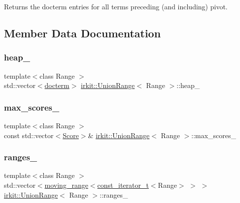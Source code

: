 Returns the docterm entries for all terms preceding (and including) pivot. 

\subsection{Member Data Documentation}
\mbox{\label{classirkit_1_1UnionRange_a613eebb9b7b8601bffdad1d842c8c7f0}} 
\subsubsection{\texorpdfstring{heap\+\_\+}{heap\_}}
{\footnotesize\ttfamily template$<$class Range $>$ \\
std\+::vector$<$\mbox{\hyperlink{structirkit_1_1UnionRange_1_1docterm}{docterm}}$>$ \mbox{\hyperlink{classirkit_1_1UnionRange}{irkit\+::\+Union\+Range}}$<$ Range $>$\+::heap\+\_\+\hspace{0.3cm}{\ttfamily [protected]}}

\mbox{\label{classirkit_1_1UnionRange_a980f7cfaf14c7c4d93b13b6d7ce6a859}} 
\subsubsection{\texorpdfstring{max\+\_\+scores\+\_\+}{max\_scores\_}}
{\footnotesize\ttfamily template$<$class Range $>$ \\
const std\+::vector$<$\mbox{\hyperlink{classirkit_1_1UnionRange_a47fb098a85581f5e33f4203e16245dae}{Score}}$>$\& \mbox{\hyperlink{classirkit_1_1UnionRange}{irkit\+::\+Union\+Range}}$<$ Range $>$\+::max\+\_\+scores\+\_\+\hspace{0.3cm}{\ttfamily [protected]}}

\mbox{\label{classirkit_1_1UnionRange_acb9b9e969f1c90bb18bf1e4eb99f124b}} 
\subsubsection{\texorpdfstring{ranges\+\_\+}{ranges\_}}
{\footnotesize\ttfamily template$<$class Range $>$ \\
std\+::vector$<$\mbox{\hyperlink{structirkit_1_1moving__range}{moving\+\_\+range}}$<$\mbox{\hyperlink{namespaceirkit_a4b1668583041117eb42c1b5a1091b804}{const\+\_\+iterator\+\_\+t}}$<$Range$>$ $>$ $>$ \mbox{\hyperlink{classirkit_1_1UnionRange}{irkit\+::\+Union\+Range}}$<$ Range $>$\+::ranges\+\_\+\hspace{0.3cm}{\ttfamily [protected]}}


